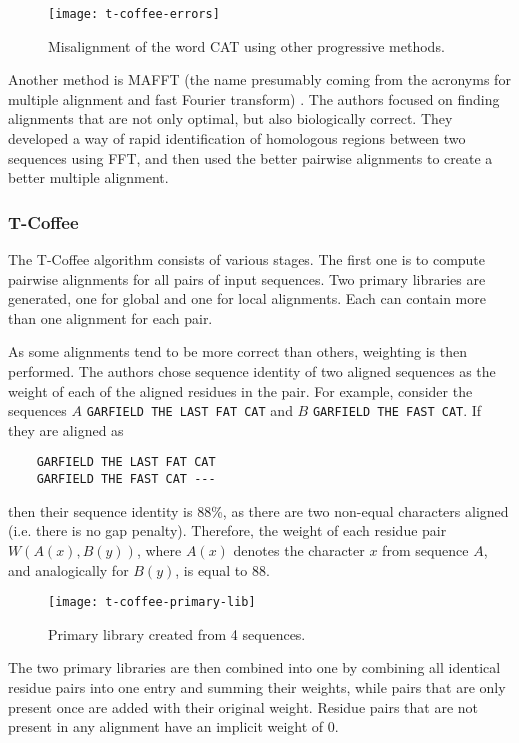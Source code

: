 \begin{figure}[h]
\centering
\texttt{[image: t-coffee-errors]}
\caption{Misalignment of the word CAT using other progressive methods. \citep[Figure~2(a)]{t_coffee}}
\end{figure}

Another method is MAFFT (the name presumably coming from the acronyms for multiple alignment and fast Fourier transform) \citep{mafft}.
The authors focused on finding alignments that are not only optimal, but also biologically correct. They developed a way of rapid identification
of homologous regions between two sequences using FFT, and then used the better pairwise alignments to create a better multiple alignment.

\subsubsection{T-Coffee}

The T-Coffee algorithm consists of various stages. The first one is to compute pairwise alignments for all pairs of input sequences.
Two primary libraries are generated, one for global and one for local alignments. Each can contain more than one alignment for each pair.

As some alignments tend to be more correct than others, weighting is then performed. The authors chose sequence identity of two aligned
sequences as the weight of each of the aligned residues in the pair. For example, consider the sequences $A$ \verb|GARFIELD THE LAST FAT CAT|
and $B$ \verb|GARFIELD THE FAST CAT|. If they are aligned as

\begin{verbatim}
    GARFIELD THE LAST FAT CAT
    GARFIELD THE FAST CAT ---
\end{verbatim}

then their sequence identity is 88\%, as there are two non-equal characters aligned (i.e. there is no gap penalty). Therefore, the weight of
each residue pair $W(A(x), B(y))$, where $A(x)$ denotes the character $x$ from sequence $A$, and analogically for $B(y)$, is equal to 88.

\begin{figure}[h]
\centering
\texttt{[image: t-coffee-primary-lib]}
\caption{Primary library created from 4 sequences. \citep[Figure~2(b)]{t_coffee}}
\end{figure}

The two primary libraries are then combined into one by combining all identical residue pairs into one entry and summing their weights, while
pairs that are only present once are added with their original weight. Residue pairs that are not present in any alignment have an implicit weight
of 0.


